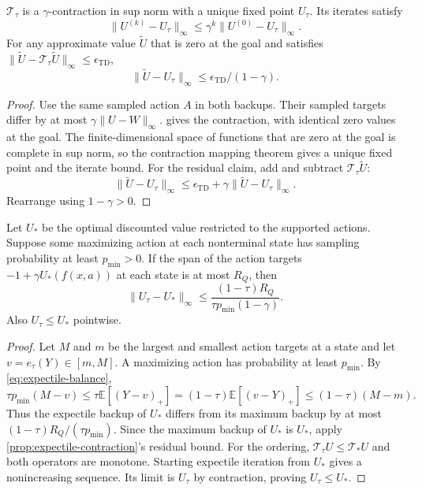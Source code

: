 \documentclass{article} %
\newcommand{\EE}{\mathbb E}
\theoremstyle{definition}
\theoremstyle{remark}
\begin{document}
\begin{proposition}
\label{prop:expectile-contraction}
$\mathcal T_\tau$ is a $\gamma$-contraction in sup norm with a unique fixed point
$U_\tau$. Its iterates satisfy
\[
 \|U^{(k)}-U_\tau\|_\infty
     \le\gamma^k\|U^{(0)}-U_\tau\|_\infty .
\]
For any approximate value $\tilde U$ that is zero at the goal and satisfies
$\|\tilde U-\mathcal T_\tau\tilde U\|_\infty\le\epsilon_{\mathrm{TD}}$,
\begin{equation}
 \|\tilde U-U_\tau\|_\infty
       \le\epsilon_{\mathrm{TD}}/(1-\gamma).
 \label{eq:expectile-residual}
\end{equation}
\end{proposition}
\begin{proof}
Use the same sampled action $A$ in both backups.
Their sampled targets differ by at most $\gamma\|U-W\|_\infty$.
 gives the contraction, with identical zero values at the goal.
The finite-dimensional space of functions that are zero at the goal is complete in sup norm,
so the contraction mapping theorem gives a unique fixed point and the iterate bound.
For the residual claim, add and subtract $\mathcal T_\tau\tilde U$:
\[
 \|\tilde U-U_\tau\|_\infty
 \le\epsilon_{\mathrm{TD}}+\gamma\|\tilde U-U_\tau\|_\infty.
\]
Rearrange using $1-\gamma>0$.
\end{proof}

\begin{proposition}
\label{prop:expectile-bias}
Let $U_*$ be the optimal discounted value restricted to the supported actions.
Suppose some maximizing action at each nonterminal state has sampling probability
at least $p_{\min}>0$. If the span of the action targets
$-1+\gamma U_*(f(x,a))$ at each state is at most $R_Q$, then
\begin{equation}
 \|U_\tau-U_*\|_\infty
 \le\frac{(1-\tau)R_Q}{\tau p_{\min}(1-\gamma)}.
 \label{eq:expectile-bias}
\end{equation}
Also $U_\tau\le U_*$ pointwise.
\end{proposition}
\begin{proof}
Let $M$ and $m$ be the largest and smallest action targets at a state and let
$v=e_\tau(Y)\in[m,M]$. A maximizing action has probability at least $p_{\min}$.
By \cref{eq:expectile-balance},
\[
 \tau p_{\min}(M-v)
 \le\tau\EE[(Y-v)_+]
 =(1-\tau)\EE[(v-Y)_+]
 \le(1-\tau)(M-m).
\]
Thus the expectile backup of $U_*$ differs from its maximum backup by at most
$(1-\tau)R_Q/(\tau p_{\min})$.
Since the maximum backup of $U_*$ is $U_*$, apply
\cref{prop:expectile-contraction}'s residual bound.
For the ordering, $\mathcal T_\tau U\le\mathcal T_*U$ and both operators are monotone.
Starting expectile iteration from $U_*$ gives a nonincreasing sequence.
Its limit is $U_\tau$ by contraction, proving $U_\tau\le U_*$.
\end{proof}
\end{document}
